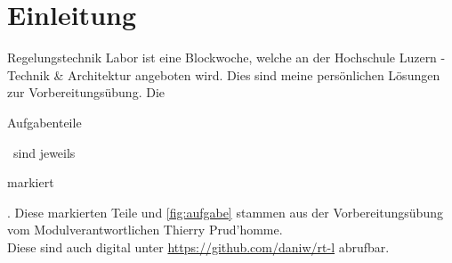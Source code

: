 \section*{Einleitung}
Regelungstechnik Labor ist eine Blockwoche, welche an der Hochschule Luzern - 
Technik \& Architektur angeboten wird. Dies sind meine persönlichen Lösungen 
zur Vorbereitungsübung. Die \begin{aufgabe}Aufgabenteile\end{aufgabe} ~sind 
jeweils \begin{aufgabe}markiert\end{aufgabe}. Diese markierten Teile und 
\autoref{fig:aufgabe} stammen aus der Vorbereitungsübung vom 
Modulverantwortlichen Thierry Prud'homme. \\
Diese sind auch digital unter \url{https://github.com/daniw/rt-l} abrufbar. 
\\
